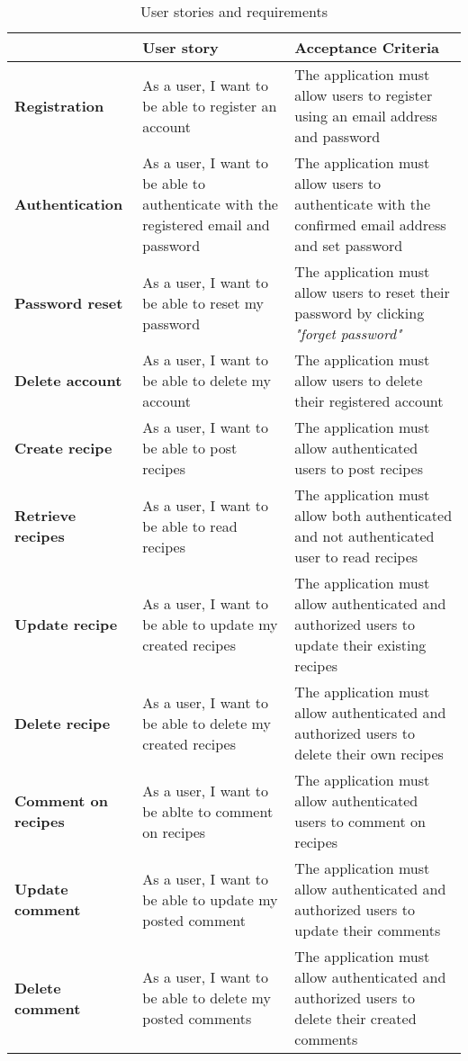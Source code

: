\begin{table}[!t]
    \centering
    \caption{User stories and requirements}
    \label{tab:functional-requirements}
    \begin{tabulary}{1.0\textwidth}{|L|L|L|}
        \hline
                & \textbf{User story} & \textbf{Acceptance Criteria} \\
        \hline
        \textbf{Registration} & As a user, I want to be able to register an account & The application must allow users to register using an email address and password \\
        \hline
        \textbf{Authentication} & As a user, I want to be able to authenticate with the registered email and password & The application must allow users to authenticate with the confirmed email address and set password \\
        \hline
        \textbf{Password reset} & As a user, I want to be able to reset my password & The application must allow users to reset their password by clicking \textit{"forget password"} \\
        \hline
        \textbf{Delete account} & As a user, I want to be able to delete my account & The application must allow users to delete their registered account \\
        \hline
        \textbf{Create recipe} & As a user, I want to be able to post recipes & The application must allow authenticated users to post recipes \\
        \hline
        \textbf{Retrieve recipes} & As a user, I want to be able to read recipes & The application must allow both authenticated and not authenticated user to read recipes \\
        \hline
        \textbf{Update recipe} & As a user, I want to be able to update my created recipes & The application must allow authenticated and authorized users to update their existing recipes \\
        \hline
        \textbf{Delete recipe} & As a user, I want to be able to delete my created recipes & The application must allow authenticated and authorized users to delete their own recipes \\
        \hline
        \textbf{Comment on recipes} & As a user, I want to be ablte to comment on recipes & The application must allow authenticated users to comment on recipes \\
        \hline
        \textbf{Update comment} & As a user, I want to be able to update my posted comment & The application must allow authenticated and authorized users to update their comments \\
        \hline
        \textbf{Delete comment} & As a user, I want to be able to delete my posted comments & The application must allow authenticated and authorized users to delete their created comments \\
        \hline
    \end{tabulary}
\end{table}
